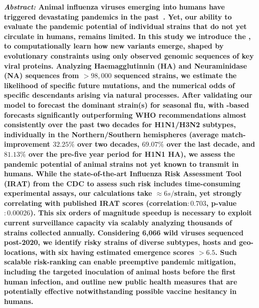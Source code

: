 \documentclass[onecolumn, compsoc,10pt]{IEEEtran}
\begin{document}
  
\maketitle  

{\bf \sffamily \fontsize{10}{12}\selectfont \noindent   
  {\normalfont \itshape Abstract:} Animal influenza  viruses emerging into humans %
  have triggered devastating  pandemics in the past~\cite{shao2017evolution,mills2004transmissibility,reid2003origin,landolt2007up}. Yet, our ability to evaluate the pandemic potential of individual strains that do not yet circulate in humans, remains limited. In this study we introduce the \enet, to computationally learn how new variants emerge, shaped by evolutionary constraints using only observed genomic sequences  of key viral proteins. Analyzing Haemagglutinnin (HA) and Neuraminidase (NA) sequences from $>98,000$ sequenced strains, we estimate the likelihood of specific future mutations, and the numerical odds of  specific descendants arising via natural processes. After validating our model to forecast the dominant strain(s) for seasonal flu, with \enet-based forecasts significantly outperforming WHO recommendations almost consistently over the past two decades for H1N1/H3N2 subtypes, individually in the Northern/Southern hemispheres (average match-improvement $32.25\% $ over two decades, $69.07\%$ over the last decade, and $81.13\%$ over the pre-\cov five year period for H1N1 HA), we assess the pandemic potential of animal strains not yet known to transmit in humans. While the state-of-the-art Influenza Risk Assessment Tool (IRAT) from the CDC to assess such risk includes time-consuming experimental assays, our calculations take $\approx 6s/$strain, yet strongly correlating with published IRAT scores (correlation$: 0.703$, p-value$: 0.00026$). This six orders of magnitude speedup is  necessary to exploit  current surveillance capacity via scalably analyzing thousands of strains collected annually. Considering 6,066 wild \infl viruses sequenced post-2020, we identify risky strains of diverse subtypes, hosts and geo-locations, with six having estimated emergence scores $> 6.5$. Such scalable risk-ranking can enable preemptive pandemic mitigation, including the targeted inoculation of animal hosts before the first human infection, and outline new public health measures that are potentially effective notwithstanding possible vaccine hesitancy in humans.}
  
\vspace{10pt} 
\end{document}
